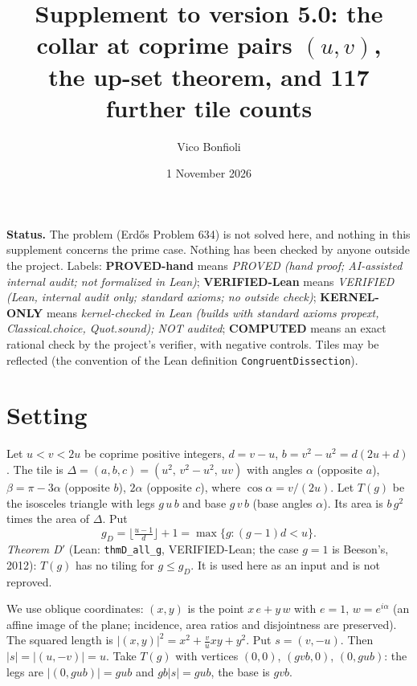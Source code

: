 \documentclass[11pt]{article}
\title{Supplement to version 5.0: the collar at coprime pairs $(u,v)$,\\ the up-set theorem, and 117 further tile counts}
\author{Vico Bonfioli}
\date{1 November 2026}
\theoremstyle{remark}
\begin{document}
\maketitle

\noindent\textbf{Status.} The problem (Erd\H{o}s Problem 634) is not solved here, and nothing in this supplement concerns the prime case. Nothing has been checked by anyone outside the project. Labels: \textbf{PROVED-hand} means \emph{PROVED (hand proof; AI-assisted internal audit; not formalized in Lean)}; \textbf{VERIFIED-Lean} means \emph{VERIFIED (Lean, internal audit only; standard axioms; no outside check)}; \textbf{KERNEL-ONLY} means \emph{kernel-checked in Lean (builds with standard axioms propext, Classical.choice, Quot.sound); NOT audited}; \textbf{COMPUTED} means an exact rational check by the project's verifier, with negative controls. Tiles may be reflected (the convention of the Lean definition \texttt{CongruentDissection}).

\section{Setting}\label{sec:setting}
Let $u<v<2u$ be coprime positive integers, $d=v-u$, $b=v^2-u^2=d(2u+d)$. The tile is $\Delta=(a,b,c)=(u^2,\,v^2-u^2,\,uv)$ with angles $\alpha$ (opposite $a$), $\beta=\pi-3\alpha$ (opposite $b$), $2\alpha$ (opposite $c$), where $\cos\alpha=v/(2u)$. Let $T(g)$ be the isosceles triangle with legs $g\,u\,b$ and base $g\,v\,b$ (base angles $\alpha$). Its area is $b\,g^2$ times the area of $\Delta$.
Put
\[
g_D=\Big\lfloor \tfrac{u-1}{d}\Big\rfloor+1=\max\{g:(g-1)d<u\}.
\]
\emph{Theorem D$'$} (Lean: \texttt{thmD\_all\_g}, VERIFIED-Lean; the case $g=1$ is Beeson's, 2012): $T(g)$ has no tiling for $g\le g_D$. It is used here as an input and is not reproved.

We use oblique coordinates: $(x,y)$ is the point $x\,e+y\,w$ with $e=1$, $w=e^{i\alpha}$ (an affine image of the plane; incidence, area ratios and disjointness are preserved). The squared length is $|(x,y)|^2=x^2+\frac vu xy+y^2$. Put $s=(v,-u)$. Then $|s|=|(u,-v)|=u$. Take $T(g)$ with vertices $(0,0)$, $(gvb,0)$, $(0,gub)$: the legs are $|(0,gub)|=gub$ and $gb|s|=gub$, the base is $gvb$.
\end{document}
